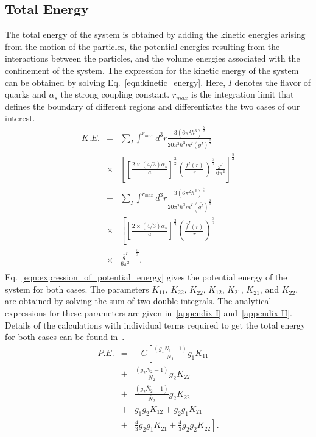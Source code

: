 \documentclass[final,3p,times,twocolumn]{elsarticle}
\begin{document}
    \subsection{Total Energy}    
    \label{subsection:total_energy}
        The total energy of the system is obtained by adding the kinetic energies arising from the motion of the particles, the potential energies resulting from the interactions between the particles, and the volume energies associated with the confinement of the system. The expression for the kinetic energy of the system can be obtained by solving Eq.~\eqref{eqn:kinetic_energy}. Here, $I$ denotes the flavor of quarks and $\alpha_{s}$ the strong coupling constant. $r_{max}$ is the integration limit that defines the boundary of different regions and differentiates the two cases of our interest. 
        \begin{eqnarray}
            K.E.  &=& \sum_I \int^{r_{max}} d^3r \frac{3(6\pi^2\hbar^3)^\frac{5}{3}}{20\pi^2\hbar^3m^I(g^I)^\frac{2}{3}} \nonumber \\
            &\times& \left[\left[\frac{2 \times (4/3)\alpha_s}{a}\right]^\frac{3}{2} \left(\frac{f^I(r)}{r}\right)^\frac{3}{2} \frac{g^I}{6\pi^2} \right]^\frac{5}{3} \nonumber \\ 
            &+& \sum_I \int^{r_{max}} d^3r \frac{3(6\pi^2\hbar^3)^\frac{5}{3}}{20\pi^2\hbar^3\overline{m}^I (\overline{g^I})^\frac{2}{3}} \nonumber \\ 
            &\times& \left[\left[\frac{2 \times (4/3)\alpha_s}{a}\right]^\frac{3}{2} \left(\frac{\overline{f}^I(r)}{r}\right)^\frac{3}{2} \right. \nonumber \\ 
            &\times& \left. \frac{\overline{g}^I}{6\pi^2}\right]^\frac{5}{3}.
            \label{eqn:kinetic_energy}
        \end{eqnarray}        
        Eq.~\eqref{eqn:expression_of_potential_energy} gives the potential energy of the system for both cases. The parameters $K_{11}$, $K_{22}$, $K_{\overline{2}\overline{2}}$, $K_{12}$, $K_{21}$, $K_{\overline{2}1}$, and $K_{\overline{2}2}$, are obtained by solving the sum of two double integrals. The analytical expressions for these parameters are given in~\ref{appendix I} and~\ref{appendix II}. Details of the calculations with individual terms required to get the total energy for both cases can be found in~\cite{aryal2024energy}.
        \begin{eqnarray}
            P.E. &=& -C\left[\frac{(g_1 N_1 - 1)}{N_1} g_1 K_{11} \right. \nonumber \\
            &+& \frac{(g_2 N_2 - 1)}{N_2} g_2 K_{22} \nonumber \\
            &+& \frac{(\overline{g}_{2} \overline{N}_{2} - 1)}{\overline{N}_{2}} \overline{g}_{2} K_{\overline{2}\overline{2}} \nonumber \\ 
            &+& g_{1} g_{2} K_{12} + g_{2} g_{1} K_{21} \nonumber \\ 
            &+& \left. \tfrac{4}{3} \overline{g}_{2} g_1 K_{\overline{2}1} + \tfrac{4}{3} \overline{g}_{2} g_2 K_{\overline{2}2}\right].
            \label{eqn:expression_of_potential_energy}
        \end{eqnarray}
\end{document}
